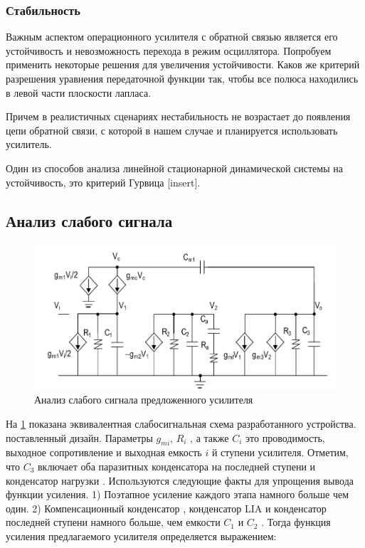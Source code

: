 \documentclass[a4paper,12pt]{article} %
\begin{document}
\subsubsection{Стабильность}

Важным аспектом операционного усилителя с обратной связью является его устойчивость и невозможность перехода в режим осциллятора. Попробуем применить некоторые решения для увеличения устойчивости. Каков же критерий разрешения уравнения передаточной функции так, чтобы все полюса находились в левой части плоскости лапласа.

Причем в реалистичных сценариях нестабильность не возрастает до появления цепи обратной связи, с которой в нашем случае и планируется использовать усилитель.

Один из способов анализа линейной стационарной динамической системы на устойчивость, это критерий Гурвица [insert].


\subsection{Анализ слабого сигнала }

\begin{figure}[H]
    \includegraphics[width=\textwidth]{small_signal.png}
    \caption{Анализ слабого сигнала предложенного усилителя}
    \label{pic:small_signal}
\end{figure}

На \ref{pic:small_signal} показана эквивалентная слабосигнальная  схема разработанного   устройства. поставленный дизайн. Параметры $g_{mi}$, $ R_i $ , а также $ C_i $ это проводимость, выходное сопротивление и выходная емкость $i$ й ступени усилителя. Отметим, что $C_3$ включает оба паразитных конденсатора на последней ступени и конденсатор нагрузки . Используются следующие факты для упрощения вывода функции усиления. 
1) Поэтапное усиление каждого этапа намного больше чем один. 2) Компенсационный конденсатор , конденсатор LIA и конденсатор последней ступени намного больше, чем  емкости $ C_1 $ и $ C_2 $ . Тогда функция усиления предлагаемого усилителя определяется выражением:
\end{document}
